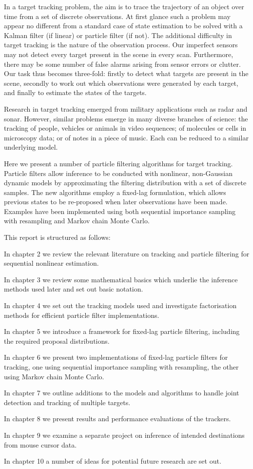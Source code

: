 In a target tracking problem, the aim is to trace the trajectory of an object over time from a set of discrete observations. At first glance such a problem may appear no different from a standard case of state estimation to be solved with a Kalman filter (if linear) or particle filter (if not). The additional difficulty in target tracking is the nature of the observation process. Our imperfect sensors may not detect every target present in the scene in every scan. Furthermore, there may be some number of false alarms arising from sensor errors or clutter. Our task thus becomes three-fold: firstly to detect what targets are present in the scene, secondly to work out which observations were generated by each target, and finally to estimate the states of the targets.

Research in target tracking emerged from military applications such as radar and sonar. However, similar problems emerge in many diverse branches of science: the tracking of people, vehicles or animals in video sequences; of molecules or cells in microscopy data; or of notes in a piece of music. Each can be reduced to a similar underlying model.

Here we present a number of particle filtering algorithms for target tracking. Particle filters allow inference to be conducted with nonlinear, non-Gaussian dynamic models by approximating the filtering distribution with a set of discrete samples. The new algorithms employ a fixed-lag formulation, which allows previous states to be re-proposed when later observations have been made. Examples have been implemented using both sequential importance sampling with resampling and Markov chain Monte Carlo.

This report is structured as follows:

In chapter 2 we review the relevant literature on tracking and particle filtering for sequential nonlinear estimation.

In chapter 3 we review some mathematical basics which underlie the inference methods used later and set out basic notation.

In chapter 4 we set out the tracking models used and investigate factorisation methods for efficient particle filter implementations.

In chapter 5 we introduce a framework for fixed-lag particle filtering, including the required proposal distributions.

In chapter 6 we present two implementations of fixed-lag particle filters for tracking, one using sequential importance sampling with resampling, the other using Markov chain Monte Carlo.

In chapter 7 we outline additions to the models and algorithms to handle joint detection and tracking of multiple targets.

In chapter 8 we present results and performance evaluations of the trackers.

In chapter 9 we examine a separate project on inference of intended destinations from mouse cursor data.

In chapter 10 a number of ideas for potential future research are set out.